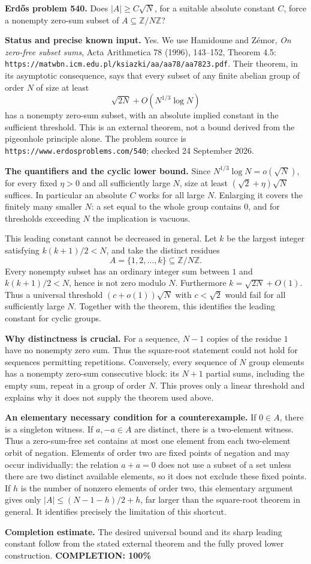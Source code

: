 \textbf{Erd\H{o}s problem 540.}
Does $|A|\geq C\sqrt N$, for a suitable absolute constant $C$, force a nonempty zero-sum subset of $A\subseteq\mathbb Z/N\mathbb Z$?

\textbf{Status and precise known input.}
Yes. We use Hamidoune and Z\'emor, \emph{On zero-free subset sums}, Acta Arithmetica 78 (1996), 143--152, Theorem 4.5:
\texttt{https://matwbn.icm.edu.pl/ksiazki/aa/aa78/aa7823.pdf}.
Their theorem, in its asymptotic consequence, says that every subset of any finite abelian group of order $N$ of size at least
\[
 \sqrt{2N}+O(N^{1/3}\log N)
\]
has a nonempty zero-sum subset, with an absolute implied constant in the sufficient threshold. This is an external theorem, not a bound derived from the pigeonhole principle alone.
The problem source is \texttt{https://www.erdosproblems.com/540}; checked 24 September 2026.

\textbf{The quantifiers and the cyclic lower bound.}
Since $N^{1/3}\log N=o(\sqrt N)$, for every fixed $\eta>0$ and all sufficiently large $N$, size at least $(\sqrt2+\eta)\sqrt N$ suffices. In particular an absolute $C$ works for all large $N$. Enlarging it covers the finitely many smaller $N$: a set equal to the whole group contains $0$, and for thresholds exceeding $N$ the implication is vacuous.

This leading constant cannot be decreased in general. Let $k$ be the largest integer satisfying $k(k+1)/2<N$, and take the distinct residues
\[
 A=\{1,2,\ldots,k\}\subseteq\mathbb Z/N\mathbb Z.
\]
Every nonempty subset has an ordinary integer sum between $1$ and $k(k+1)/2<N$, hence is not zero modulo $N$. Furthermore $k=\sqrt{2N}+O(1)$. Thus a universal threshold $(c+o(1))\sqrt N$ with $c<\sqrt2$ would fail for all sufficiently large $N$. Together with the theorem, this identifies the leading constant for cyclic groups.

\textbf{Why distinctness is crucial.}
For a sequence, $N-1$ copies of the residue $1$ have no nonempty zero sum. Thus the square-root statement could not hold for sequences permitting repetitions.
Conversely, every sequence of $N$ group elements has a nonempty zero-sum consecutive block: its $N+1$ partial sums, including the empty sum, repeat in a group of order $N$. This proves only a linear threshold and explains why it does not supply the theorem used above.

\textbf{An elementary necessary condition for a counterexample.}
If $0\in A$, there is a singleton witness. If $a,-a\in A$ are distinct, there is a two-element witness. Thus a zero-sum-free set contains at most one element from each two-element orbit of negation. Elements of order two are fixed points of negation and may occur individually: the relation $a+a=0$ does not use a subset of a set unless there are two distinct available elements, so it does not exclude these fixed points.
If $h$ is the number of nonzero elements of order two, this elementary argument gives only $|A|\leq(N-1-h)/2+h$, far larger than the square-root theorem in general. It identifies precisely the limitation of this shortcut.

\textbf{Completion estimate.}
The desired universal bound and its sharp leading constant follow from the stated external theorem and the fully proved lower construction.
\textbf{COMPLETION: 100\%}
